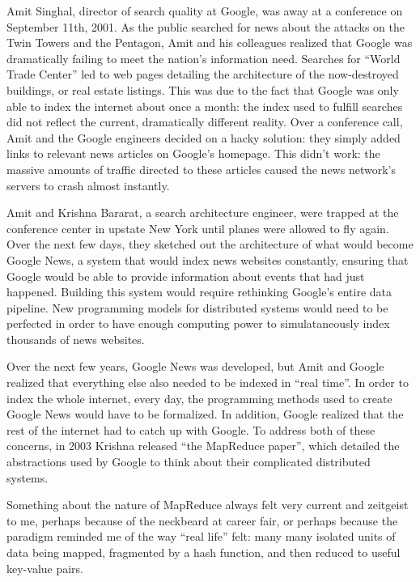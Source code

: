 \documentclass[12pt]{article}
\begin{document}
Amit Singhal, director of search quality at Google, was away at a conference on
September 11th, 2001. As the public searched for news about the attacks on the
Twin Towers and the Pentagon, Amit and his colleagues realized that Google was
dramatically failing to meet the nation's information need. Searches for ``World
Trade Center'' led to web pages detailing the architecture of the now-destroyed
buildings, or real estate listings.  This was due to the fact that Google was
only able to index the internet about once a month: the index used to fulfill
searches did not reflect the current, dramatically different reality.  Over a
conference call, Amit and the Google engineers decided on a hacky solution: they
simply added links to relevant news articles on Google's homepage.  This didn't
work: the massive amounts of traffic directed to these articles caused the news
network's servers to crash almost instantly.

Amit and Krishna Bararat, a search architecture engineer, were trapped at the
conference center in upstate New York until planes were allowed to fly again.
Over the next few days, they sketched out the architecture of what would become
Google News, a system that would index news websites constantly, ensuring that
Google would be able to provide information about events that had just happened.
Building this system would require rethinking Google's entire data pipeline.
New programming models for distributed systems would need to be perfected in
order to have enough computing power to simulataneously index thousands of news
websites.

Over the next few years, Google News was developed, but Amit and Google realized
that everything else also needed to be indexed in ``real time''.  In order to
index the whole internet, every day, the programming methods used to create
Google News would have to be formalized.  In addition, Google realized that the
rest of the internet had to catch up with Google.  To address both of these
concerns, in 2003 Krishna released ``the MapReduce paper'', which detailed the
abstractions used by Google to think about their complicated distributed
systems.  

Something about the nature of MapReduce always felt very current and zeitgeist
to me, perhaps because of the neckbeard at career fair, or perhaps because the
paradigm reminded me of the way ``real life'' felt: many many isolated units of
data being mapped, fragmented by a hash function, and then reduced to useful
key-value pairs.
\end{document}
